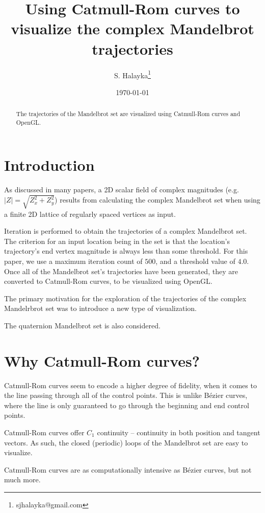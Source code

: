 \documentclass[12pt]{article}
\title{Using Catmull-Rom curves to visualize the complex Mandelbrot trajectories}
\author{S. Halayka\footnote{sjhalayka@gmail.com}}
\date{\today}
\begin{document}
\maketitle

\begin{abstract}
The trajectories of the Mandelbrot set are visualized using Catmull-Rom curves and OpenGL.
\end{abstract}



\section{Introduction}

As discussed in many papers, a 2D scalar field of complex magnitudes (e.g. $|Z| = \sqrt{Z_x^2 + Z_y^2}$) results from calculating the complex Mandelbrot set when using a finite 2D lattice of regularly spaced vertices as input.

Iteration is performed to obtain the trajectories of a complex Mandelbrot set.
The criterion for an input location being in the set is that the location's trajectory's end vertex magnitude is always less than some threshold.
For this paper, we use a maximum iteration count of $500$, and a threshold value of $4.0$.
Once all of the Mandelbrot set's trajectories have been generated, they are converted to Catmull-Rom curves, to be visualized using OpenGL. 

The primary motivation for the exploration of the trajectories of the complex Mandelrbrot set was to introduce a new type of visualization.

The quaternion Mandelbrot set is also considered.


\section{Why Catmull-Rom curves?}

Catmull-Rom curves seem to encode a higher degree of fidelity, when it comes to the line passing through all of the control points.
This is unlike B\'ezier curves, where the line is only guaranteed to go through the beginning and end control points.

Catmull-Rom curves offer $C_1$ continuity -- continuity in both position and tangent vectors.
As such, the closed (periodic) loops of the Mandelbrot set are easy to visualize.

Catmull-Rom curves are as computationally intensive as B\'ezier curves, but not much more.
\end{document}
